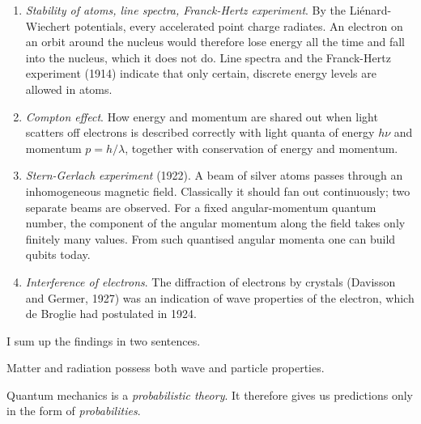 \begin{enumerate}
	\begin{equation*}
		E_{\mathrm{kin,max}} = \tfrac12 m_{\mathrm{e}} v_{\max}^2 = h\nu - W
	\end{equation*}
	with the binding energy $W$ of the material (written non-relativistically). Below the frequency $W/h$ a single light quantum releases no electron in this model.
	\item \emph{Stability of atoms, line spectra, Franck-Hertz experiment}. By the Liénard-Wiechert potentials, every accelerated point charge radiates. An electron on an orbit around the nucleus would therefore lose energy all the time and fall into the nucleus, which it does not do. Line spectra and the Franck-Hertz experiment (1914) indicate that only certain, discrete energy levels are allowed in atoms.
	\item \emph{Compton effect}. How energy and momentum are shared out when light scatters off electrons is described correctly with light quanta of energy $h\nu$ and momentum $p = h/\lambda$, together with conservation of energy and momentum.
	\item \emph{Stern-Gerlach experiment} (1922). A beam of silver atoms passes through an inhomogeneous magnetic field. Classically it should fan out continuously; two separate beams are observed. For a fixed angular-momentum quantum number, the component of the angular momentum along the field takes only finitely many values. From such quantised angular momenta one can build qubits today.
	\item \emph{Interference of electrons}. The diffraction of electrons by crystals (Davisson and Germer, 1927) was an indication of wave properties of the electron, which de Broglie had postulated in 1924.
\end{enumerate}
I sum up the findings in two sentences.

\begin{merksatz}
Matter and radiation possess both wave and particle properties.
\end{merksatz}

\begin{merksatz}
Quantum mechanics is a \emph{probabilistic theory}. It therefore gives us predictions only in the form of \emph{probabilities}.
\end{merksatz}

